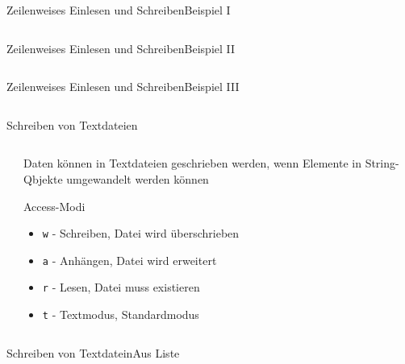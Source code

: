 \documentclass[xelatex,aspectratio=169]{beamer}
\begin{document}
\begin{frame}{Zeilenweises Einlesen und Schreiben}{Beispiel I}
    \inputminted[firstline=6,lastline=19]{python}{src/io_example.py}
\end{frame}

\begin{frame}{Zeilenweises Einlesen und Schreiben}{Beispiel II}
    \inputminted[firstline=26,lastline=37]{python}{src/io_example.py}
\end{frame}

\begin{frame}{Zeilenweises Einlesen und Schreiben}{Beispiel III}
    \inputminted[firstline=43,lastline=52]{python}{src/io_example.py}
\end{frame}

\begin{frame}{Schreiben von Textdateien}
    \begin{columns}
        \begin{column}{0.5\textwidth}
            \inputminted[firstline=1,lastline=9]{python}{src/io_write_example.py}
        \end{column}
        \begin{column}{0.5\textwidth}
            Daten können in Textdateien geschrieben werden, wenn Elemente in String-Qbjekte umgewandelt werden können

            \begin{block}{Access-Modi}
                \begin{itemize}
                    \item \texttt{w} - Schreiben, Datei wird überschrieben
                    \item \texttt{a} - Anhängen, Datei wird erweitert
                    \item \texttt{r} - Lesen, Datei muss existieren
                    \item \texttt{t} - Textmodus, Standardmodus
                \end{itemize}

            \end{block}
        \end{column}
    \end{columns}

\end{frame}

\begin{frame}{Schreiben von Textdatein}{Aus Liste}
    \inputminted[firstline=15,lastline=26]{python}{src/io_write_example.py}
\end{frame}
\end{document}
